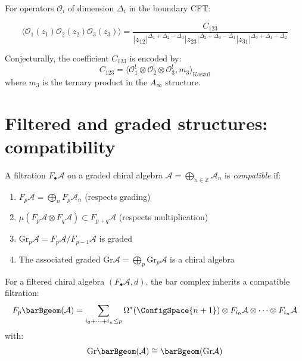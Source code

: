 \begin{example}
For operators $\mathcal{O}_i$ of dimension $\Delta_i$ in the boundary CFT:

\[\langle \mathcal{O}_1(z_1) \mathcal{O}_2(z_2) \mathcal{O}_3(z_3) \rangle = \frac{C_{123}}{|z_{12}|^{\Delta_1+\Delta_2-\Delta_3}|z_{23}|^{\Delta_2+\Delta_3-\Delta_1}|z_{31}|^{\Delta_3+\Delta_1-\Delta_2}}\]

Conjecturally, the coefficient $C_{123}$ is encoded by:
\[C_{123} = \langle \mathcal{O}_1^! \otimes \mathcal{O}_2^! \otimes \mathcal{O}_3^!, m_3 \rangle_{\text{Koszul}}\]
where $m_3$ is the ternary product in the $A_\infty$ structure.
\end{example}

\section{Filtered and graded structures: compatibility}

\begin{definition}
A filtration $F_\bullet\mathcal{A}$ on a graded chiral algebra $\mathcal{A} = \bigoplus_{n \in \mathbb{Z}} \mathcal{A}_n$ is \emph{compatible} if:
\begin{enumerate}
\item $F_p\mathcal{A} = \bigoplus_{n} F_p\mathcal{A}_n$ (respects grading)
\item $\mu(F_p\mathcal{A} \otimes F_q\mathcal{A}) \subset F_{p+q}\mathcal{A}$ (respects multiplication)
\item $\text{Gr}_p\mathcal{A} = F_p\mathcal{A}/F_{p-1}\mathcal{A}$ is graded
\item The associated graded $\text{Gr}\mathcal{A} = \bigoplus_p \text{Gr}_p\mathcal{A}$ is a chiral algebra
\end{enumerate}
\end{definition}

\begin{theorem}
\label{thm:filtered-bar-complex}
For a filtered chiral algebra $(F_\bullet\mathcal{A}, d)$, the bar complex inherits a compatible filtration:
\[F_p\barBgeom(\mathcal{A}) = \sum_{i_0 + \cdots + i_n \leq p} \Omega^*(\ConfigSpace{n+1}) \otimes F_{i_0}\mathcal{A} \otimes \cdots \otimes F_{i_n}\mathcal{A}\]
with:
\[\text{Gr}\barBgeom(\mathcal{A}) \cong \barBgeom(\text{Gr}\mathcal{A})\]
\end{theorem}


